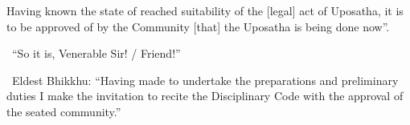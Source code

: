   Having known the state of reached suitability of the [legal] act of Uposatha, it is to be approved of by the Community [that] the Uposatha is being done now''.

\begin{center}
  \anglebracketleft\ \hspace{-0.5mm}``So it is, Venerable Sir! / Friend!'' \hspace{-0.5mm}\anglebracketright\
\end{center}

\begin{center}
  \anglebracketleft\ \hspace{-0.5mm}Eldest Bhikkhu: ``Having made to undertake the preparations and preliminary duties I make the invitation to recite the Disciplinary Code with the approval of the seated community.'' \hspace{-0.5mm}\anglebracketright\
\end{center}

\clearpage
